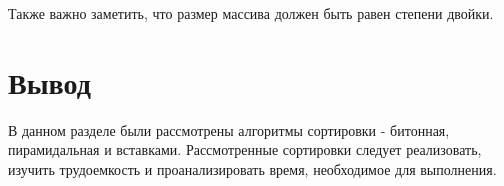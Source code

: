 Также важно заметить, что размер массива должен быть равен степени двойки.
\section*{Вывод}
В данном разделе были рассмотрены алгоритмы сортировки - битонная, пирамидальная и вставками.
Рассмотренные сортировки следует реализовать, изучить трудоемкость и проанализировать время, необходимое для выполнения.
